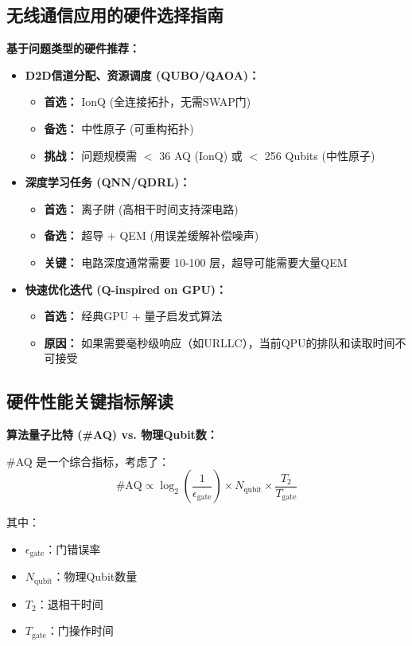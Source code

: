 \documentclass[11pt,a4paper]{article}
\begin{document}
\subsection{无线通信应用的硬件选择指南}

\textbf{基于问题类型的硬件推荐：}

\begin{itemize}
\item \textbf{D2D信道分配、资源调度 (QUBO/QAOA)：}
\begin{itemize}
\item \textbf{首选：} IonQ (全连接拓扑，无需SWAP门)
\item \textbf{备选：} 中性原子 (可重构拓扑)
\item \textbf{挑战：} 问题规模需 $<$ 36 AQ (IonQ) 或 $<$ 256 Qubits (中性原子)
\end{itemize}

\item \textbf{深度学习任务 (QNN/QDRL)：}
\begin{itemize}
\item \textbf{首选：} 离子阱 (高相干时间支持深电路)
\item \textbf{备选：} 超导 + QEM (用误差缓解补偿噪声)
\item \textbf{关键：} 电路深度通常需要 10-100 层，超导可能需要大量QEM
\end{itemize}

\item \textbf{快速优化迭代 (Q-inspired on GPU)：}
\begin{itemize}
\item \textbf{首选：} 经典GPU + 量子启发式算法
\item \textbf{原因：} 如果需要毫秒级响应（如URLLC），当前QPU的排队和读取时间不可接受
\end{itemize}
\end{itemize}

\subsection{硬件性能关键指标解读}

\textbf{算法量子比特 (\#AQ) vs. 物理Qubit数：}

\#AQ 是一个综合指标，考虑了：
\begin{equation}
\text{\#AQ} \propto \log_2\left(\frac{1}{\epsilon_{\text{gate}}}\right) \times N_{\text{qubit}} \times \frac{T_2}{T_{\text{gate}}}
\end{equation}

其中：
\begin{itemize}
\item $\epsilon_{\text{gate}}$：门错误率
\item $N_{\text{qubit}}$：物理Qubit数量
\item $T_2$：退相干时间
\item $T_{\text{gate}}$：门操作时间
\end{itemize}
\end{document}
